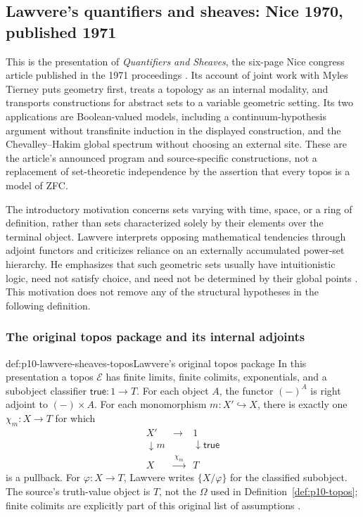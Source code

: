 \subsection{Lawvere's quantifiers and sheaves: Nice 1970, published 1971}
\label{sec:p10-n-d-023-source-01}

This is the presentation of \emph{Quantifiers and Sheaves}, the six-page
Nice congress article published in the 1971 proceedings
\cite[pp.~329--334]{Lawvere1970}.  Its account of joint work with Myles
Tierney puts geometry first, treats a topology as an internal modality,
and transports constructions for abstract sets to a variable geometric
setting.  Its two applications are Boolean-valued models, including a
continuum-hypothesis argument without transfinite induction in the
displayed construction, and the Chevalley--Hakim global spectrum without
choosing an external site.  These are the article's announced program and
source-specific constructions, not a replacement of set-theoretic
independence by the assertion that every topos is a model of ZFC.

The introductory motivation concerns sets varying with time, space, or a
ring of definition, rather than sets characterized solely by their
elements over the terminal object.  Lawvere interprets opposing
mathematical tendencies through adjoint functors and criticizes reliance
on an externally accumulated power-set hierarchy.  He emphasizes that
such geometric sets usually have intuitionistic logic, need not satisfy
choice, and need not be determined by their global points
\cite[p.~329]{Lawvere1970}.  This motivation does not remove any of the
structural hypotheses in the following definition.

\subsubsection{The original topos package and its internal adjoints}

\begin{hbdefinition}{def:p10-lawvere-sheaves-topos}{Lawvere's original topos package}
In this presentation a topos \(\mathcal E\) has finite limits, finite
colimits, exponentials, and a subobject classifier
\(\mathsf{true}:1\to T\).  For each object \(A\), the functor
\((-)^A\) is right adjoint to \((-)\times A\).  For each monomorphism
\(m:X'\hookrightarrow X\), there is exactly one
\(\chi_m:X\to T\) for which
\[
\begin{array}{ccc}
X'&\longrightarrow&1\\
\downarrow{\scriptstyle m}&&\downarrow{\scriptstyle\mathsf{true}}\\
X&\xrightarrow{\ \chi_m\ }&T
\end{array}
\]
is a pullback.  For \(\varphi:X\to T\), Lawvere writes
\(\{X/\varphi\}\) for the classified subobject.  The source's
truth-value object is \(T\), not the \(\Omega\) used in
Definition~\ref{def:p10-topos}; finite colimits are explicitly part of
this original list of assumptions \cite[pp.~329--330]{Lawvere1970}.
\end{hbdefinition}

